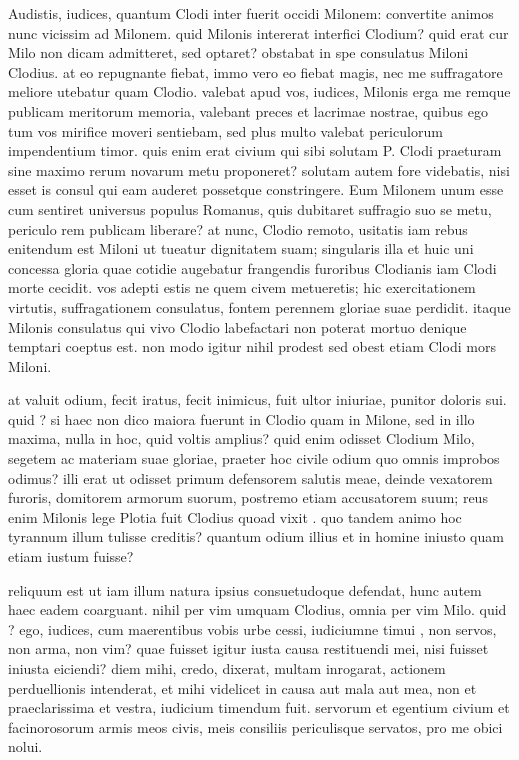  Audistis, iudices, quantum Clodi inter fuerit occidi Milonem: convertite animos nunc vicissim ad Milonem. quid Milonis intererat interfici Clodium? quid erat cur Milo non dicam admitteret, sed optaret? obstabat in spe consulatus Miloni Clodius. at eo repugnante fiebat, immo vero eo fiebat magis, nec me suffragatore meliore utebatur quam Clodio. valebat apud vos, iudices, Milonis erga me remque publicam meritorum memoria, valebant preces et lacrimae nostrae, quibus ego tum vos mirifice moveri sentiebam, sed plus multo valebat periculorum impendentium timor. quis enim erat civium qui sibi solutam P. Clodi praeturam sine maximo rerum novarum metu proponeret? solutam autem fore videbatis, nisi esset is consul qui eam auderet possetque constringere. Eum Milonem unum esse cum sentiret universus populus Romanus, quis dubitaret suffragio suo se metu, periculo rem publicam liberare? at nunc, Clodio remoto, usitatis iam rebus enitendum est Miloni ut tueatur dignitatem suam; singularis illa et huic uni concessa gloria quae cotidie augebatur frangendis furoribus Clodianis iam Clodi morte cecidit. vos adepti estis ne quem civem metueretis; hic exercitationem virtutis, suffragationem consulatus, fontem perennem gloriae suae perdidit. itaque Milonis consulatus qui vivo Clodio labefactari non poterat mortuo denique temptari coeptus est. non modo igitur nihil prodest sed obest etiam Clodi mors Miloni.

 at valuit odium, fecit iratus, fecit inimicus, fuit ultor iniuriae, punitor doloris sui. quid ? si haec non dico maiora fuerunt in Clodio quam in Milone, sed in illo maxima, nulla in hoc, quid voltis amplius? quid enim odisset Clodium Milo, segetem ac materiam suae gloriae, praeter hoc civile odium quo omnis improbos odimus? illi erat ut odisset primum defensorem salutis meae, deinde vexatorem furoris, domitorem armorum suorum, postremo etiam accusatorem suum; reus enim Milonis lege Plotia fuit Clodius quoad vixit . quo tandem animo hoc tyrannum illum tulisse creditis? quantum odium illius et in homine iniusto quam etiam iustum fuisse?

 reliquum est ut iam illum natura ipsius consuetudoque defendat, hunc autem haec eadem coarguant. nihil per vim umquam Clodius, omnia per vim Milo. quid ? ego, iudices, cum maerentibus vobis urbe cessi, iudiciumne timui , non servos, non arma, non vim? quae fuisset igitur iusta causa restituendi mei, nisi fuisset iniusta eiciendi? diem mihi, credo, dixerat, multam inrogarat, actionem perduellionis intenderat, et mihi videlicet in causa aut mala aut mea, non et praeclarissima et vestra, iudicium timendum fuit. servorum et egentium civium et facinorosorum armis meos civis, meis consiliis periculisque servatos, pro me obici nolui.

